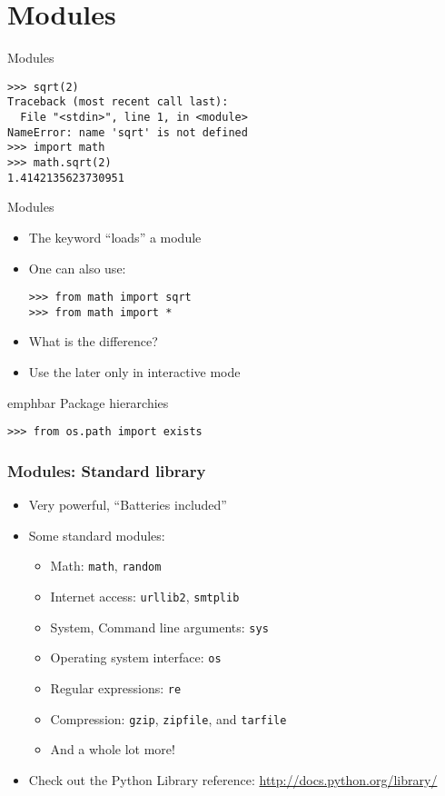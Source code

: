\documentclass[14pt,compress]{beamer}
\newcommand{\emphbar}[1]
{\begin{beamercolorbox}[rounded=true]{emphbar} 
      {#1}
 \end{beamercolorbox}
}
\newcommand{\typ}[1]{\texttt{#1}}
\newcommand{\kwrd}[1]{ \texttt{\textbf{\color{blue}{#1}}}  }
\begin{document}

\section{Modules}

\begin{frame}[fragile]
    {Modules}
\begin{lstlisting}
>>> sqrt(2)
Traceback (most recent call last):
  File "<stdin>", line 1, in <module>
NameError: name 'sqrt' is not defined
>>> import math        
>>> math.sqrt(2)
1.4142135623730951
\end{lstlisting}
\end{frame}

\begin{frame}[fragile]
    {Modules}
  \begin{itemize}
    \item The \kwrd{import} keyword ``loads'' a module
    \item One can also use:
      \begin{lstlisting}
>>> from math import sqrt
>>> from math import *
      \end{lstlisting}    
    \item What is the difference?
    \item \alert{Use the later only in interactive mode}
    \end{itemize}
  \emphbar{Package hierarchies}
      \begin{lstlisting}
>>> from os.path import exists
      \end{lstlisting}
\end{frame}

\begin{frame}
  \frametitle{Modules: Standard library}
  \begin{itemize}
  \item Very powerful, ``Batteries included''
  \item Some standard modules:
    \begin{itemize}
    \item Math: \typ{math}, \typ{random}
    \item Internet access: \typ{urllib2}, \typ{smtplib}
    \item System, Command line arguments: \typ{sys}
    \item Operating system interface: \typ{os}
    \item Regular expressions: \typ{re}
    \item Compression: \typ{gzip}, \typ{zipfile}, and \typ{tarfile}
    \item And a whole lot more!
    \end{itemize}
  \item Check out the Python Library reference:
    \url{http://docs.python.org/library/}
  \end{itemize}
\end{frame}
\end{document}
